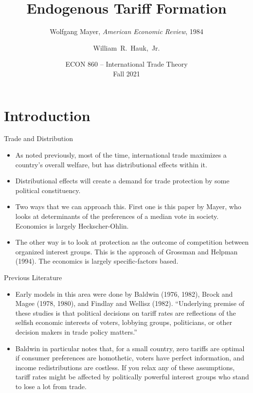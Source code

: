 \documentclass[aspectratio=169]{beamer}
\title[Mayer (1984)] %
{Endogenous Tariff Formation}
\subtitle{Wolfgang Mayer, \emph{American Economic Review}, 1984}
\author [Hauk] %
{William~R.~Hauk,~Jr.} %
\institute[UofSC] %
{
  Darla Moore School of Business\\
  University of South Carolina
}
\date[ECON 860, Fall 2021] %
{ECON 860 -- International Trade Theory\\Fall 2021}
\begin{document}
\frame{\titlepage}


\section{Introduction}


\begin{frame}{Trade and Distribution}

\begin{itemize}
    \item<1-> As noted previously, most of the time, international trade maximizes a country’s overall welfare, but has distributional effects within it.
    \item<2-> Distributional effects will create a demand for trade protection by some political constituency.
    \item<3-> Two ways that we can approach this.  First one is this paper by Mayer, who looks at determinants of the preferences of a median vote in society.  Economics is largely Heckscher-Ohlin.
    \item<4-> The other way is to look at protection as the outcome of competition between organized interest groups.  This is the approach of Grossman and Helpman (1994).  The economics is largely specific-factors based.
\end{itemize}
    
\end{frame}


\begin{frame}{Previous Literature}

\begin{itemize}
    \item<1->  Early models in this area were done by Baldwin (1976, 1982), Brock and Magee (1978, 1980), and Findlay and Wellisz (1982).  ``Underlying premise of these studies is that political decisions on tariff rates are reflections of the selfish economic interests of voters, lobbying groups, politicians, or other decision makers in trade policy matters.”
    \item<2->  Baldwin in particular notes that, for a small country, zero tariffs are optimal if consumer preferences are homothetic, voters have perfect information, and income redistributions are costless.  If you relax any of these assumptions, tariff rates might be affected by politically powerful interest groups who stand to lose a lot from trade.
\end{itemize}
    
\end{frame}
\end{document}
